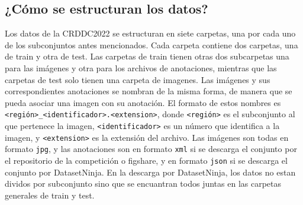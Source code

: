 \subsection{¿Cómo se estructuran los datos?}
Los datos de la CRDDC2022 se estructuran en siete carpetas, una por cada uno de los subconjuntos antes mencionados. Cada carpeta contiene dos carpetas, una de train y otra de test. Las carpetas de train tienen otras dos subcarpetas una para las imágenes y otra para los archivos de anotaciones, mientras que las carpetas de test solo tienen una carpeta de imagenes. Las imágenes y sus correspondientes anotaciones se nombran de la misma forma, de manera que se pueda asociar una imagen con su anotación. El formato de estos nombres es \texttt{<región>\_<identificador>.<extension>}, donde \texttt{<región>} es el subconjunto al que pertenece la imagen, \texttt{<identificador>} es un número que identifica a la imagen, y \texttt{<extension>} es la extensión del archivo. Las imágenes son todas en formato \texttt{jpg}, y las anotaciones son en formato \texttt{xml} si se descarga el conjunto por el repositorio de la competición o figshare, y en formato \texttt{json} si se descarga el conjunto por DatasetNinja. En la descarga por DatasetNinja, los datos no estan dividos por subconjunto sino que se encuantran todos juntas en las carpetas generales de train y test.


